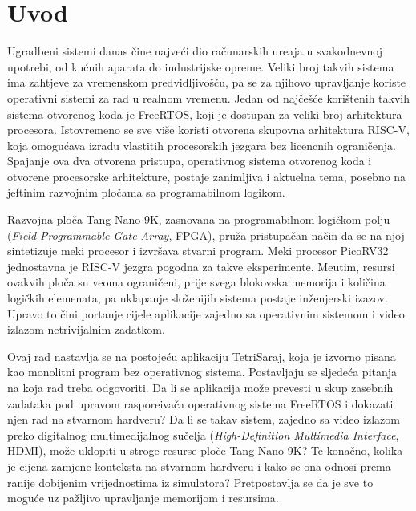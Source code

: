 \chapter*{Uvod}

Ugradbeni sistemi danas \v{c}ine najve\'ci dio ra\v{c}unarskih ure\dj{}aja u
svakodnevnoj upotrebi, od ku\'cnih aparata do industrijske opreme. Veliki broj
takvih sistema ima zahtjeve za vremenskom predvidljivo\v{s}\'cu, pa se za
njihovo upravljanje koriste operativni sistemi za rad u realnom vremenu. Jedan
od naj\v{c}e\v{s}\'ce kori\v{s}tenih takvih sistema otvorenog koda je FreeRTOS,
koji je dostupan za veliki broj arhitektura procesora. Istovremeno se sve vi\v{s}e
koristi otvorena skupovna arhitektura RISC-V, koja omogu\'cava izradu vlastitih
procesorskih jezgara bez licencnih ograni\v{c}enja. Spajanje ova dva otvorena
pristupa, operativnog sistema otvorenog koda i otvorene procesorske arhitekture,
postaje zanimljiva i aktuelna tema, posebno na jeftinim razvojnim plo\v{c}ama sa
programabilnom logikom.

Razvojna plo\v{c}a Tang Nano 9K, zasnovana na programabilnom logi\v{c}kom polju
(\foreignlanguage{english}{\emph{Field Programmable Gate Array}}, FPGA), pru\v{z}a
pristupa\v{c}an na\v{c}in da se na njoj sintetizuje meki procesor i izvr\v{s}ava
stvarni program. Meki procesor PicoRV32 jednostavna je RISC-V jezgra pogodna za
takve eksperimente. Me\dj{}utim, resursi ovakvih plo\v{c}a su veoma ograni\v{c}eni,
prije svega blokovska memorija i koli\v{c}ina logi\v{c}kih elemenata, pa
uklapanje slo\v{z}enijih sistema postaje in\v{z}enjerski izazov. Upravo to
\v{c}ini portanje cijele aplikacije zajedno sa operativnim sistemom i video
izlazom netrivijalnim zadatkom.

Ovaj rad nastavlja se na postoje\'cu aplikaciju TetriSaraj, koja je izvorno
pisana kao monolitni program bez operativnog sistema. Postavljaju se sljede\'ca
pitanja na koja rad treba odgovoriti. Da li se aplikacija mo\v{z}e prevesti u
skup zasebnih zadataka pod upravom raspore\dj{}iva\v{c}a operativnog sistema
FreeRTOS i dokazati njen rad na stvarnom hardveru? Da li se takav sistem,
zajedno sa video izlazom preko digitalnog multimedijalnog su\v{c}elja
(\foreignlanguage{english}{\emph{High-Definition Multimedia Interface}}, HDMI),
mo\v{z}e uklopiti u stroge resurse plo\v{c}e Tang Nano 9K? Te kona\v{c}no, kolika
je cijena zamjene konteksta na stvarnom hardveru i kako se ona odnosi prema
ranije dobijenim vrijednostima iz simulatora? Pretpostavlja se da je sve to
mogu\'ce uz pa\v{z}ljivo upravljanje memorijom i resursima.

